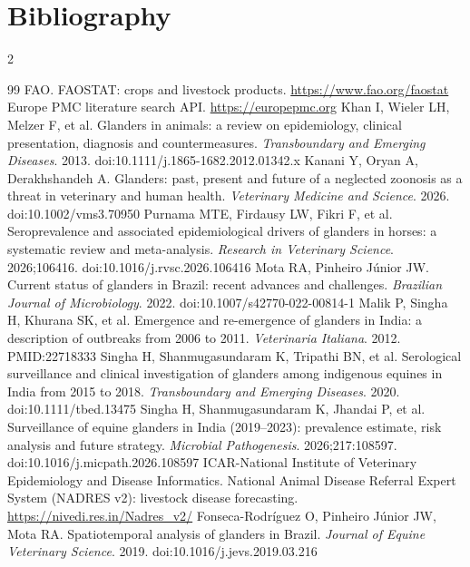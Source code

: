 \documentclass[10pt,openany]{report}
\begin{document}
\chapter*{Bibliography}
\renewcommand{\bibname}{}
\begin{multicols}{2}
\begin{thebibliography}{99}
 FAO. FAOSTAT: crops and livestock products. \url{https://www.fao.org/faostat}
 Europe PMC literature search API. \url{https://europepmc.org}
 Khan I, Wieler LH, Melzer F, et al. Glanders in animals: a review on epidemiology, clinical presentation, diagnosis and countermeasures. \emph{Transboundary and Emerging Diseases}. 2013. doi:10.1111/j.1865-1682.2012.01342.x
 Kanani Y, Oryan A, Derakhshandeh A. Glanders: past, present and future of a neglected zoonosis as a threat in veterinary and human health. \emph{Veterinary Medicine and Science}. 2026. doi:10.1002/vms3.70950
 Purnama MTE, Firdausy LW, Fikri F, et al. Seroprevalence and associated epidemiological drivers of glanders in horses: a systematic review and meta-analysis. \emph{Research in Veterinary Science}. 2026;106416. doi:10.1016/j.rvsc.2026.106416
 Mota RA, Pinheiro J\'unior JW. Current status of glanders in Brazil: recent advances and challenges. \emph{Brazilian Journal of Microbiology}. 2022. doi:10.1007/s42770-022-00814-1
 Malik P, Singha H, Khurana SK, et al. Emergence and re-emergence of glanders in India: a description of outbreaks from 2006 to 2011. \emph{Veterinaria Italiana}. 2012. PMID:22718333
 Singha H, Shanmugasundaram K, Tripathi BN, et al. Serological surveillance and clinical investigation of glanders among indigenous equines in India from 2015 to 2018. \emph{Transboundary and Emerging Diseases}. 2020. doi:10.1111/tbed.13475
 Singha H, Shanmugasundaram K, Jhandai P, et al. Surveillance of equine glanders in India (2019--2023): prevalence estimate, risk analysis and future strategy. \emph{Microbial Pathogenesis}. 2026;217:108597. doi:10.1016/j.micpath.2026.108597
 ICAR-National Institute of Veterinary Epidemiology and Disease Informatics. National Animal Disease Referral Expert System (NADRES v2): livestock disease forecasting. \url{https://nivedi.res.in/Nadres_v2/}
 Fonseca-Rodr\'iguez O, Pinheiro J\'unior JW, Mota RA. Spatiotemporal analysis of glanders in Brazil. \emph{Journal of Equine Veterinary Science}. 2019. doi:10.1016/j.jevs.2019.03.216

\end{thebibliography}
\end{multicols}
\end{document}
